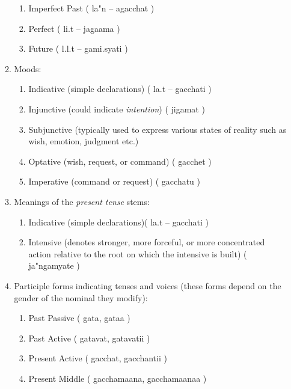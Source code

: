 \documentclass[a4paper, 12pt]{article}
\newcommand \sans[1]{
    \textsanskrit{#1}
}
\begin{document}
\begin{enumerate}
\begin{enumerate}
\begin{enumerate}
                        \item Imperfect Past (\sans{la"n -- agacchat})
                        \item Perfect (\sans{li.t -- jagaama})
                        \item Future (\sans{l.l.t -- gami.syati})
                    \end{enumerate}
                \item Moods: 
                    \begin{enumerate}
                        \item Indicative (simple declarations) (\sans{la.t -- gacchati})
                        \item Injunctive (could indicate \emph{intention}) (\sans{jigamat})
                        \item Subjunctive (typically used to express various states of reality such as wish, emotion, judgment etc.)
                        \item Optative (wish, request, or command) (\sans{gacchet})
                        \item Imperative (command or request) (\sans{gacchatu})
                    \end{enumerate}
                \item Meanings of the \emph{present tense} stems:
                    \begin{enumerate}
                        \item Indicative (simple declarations)(\sans{la.t -- gacchati})
                        \item Intensive (denotes stronger, more forceful, or more concentrated action relative to the root on which the intensive is built) (\sans{ja"ngamyate})
                    \end{enumerate}
                \item Participle forms indicating tenses and voices (these forms depend on the gender of the nominal they modify):
                    \begin{enumerate}
                        \item Past Passive (\sans{gata, gataa})
                        \item Past Active (\sans{gatavat, gatavatii})
                        \item Present Active (\sans{gacchat, gacchantii})
                        \item Present Middle (\sans{gacchamaana, gacchamaanaa})

\end{enumerate}
\end{enumerate}
\end{enumerate}
\end{document}
